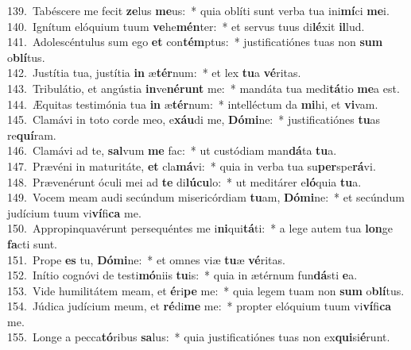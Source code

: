{139.~}Tabéscere me fecit \textbf{ze}lus \textbf{me}us:~* quia oblíti sunt verba tua ini\textbf{mí}ci \textbf{me}i.\\
{140.~}Ignítum elóquium tuum \textbf{ve}he\textbf{mén}ter:~* et servus tuus di\textbf{lé}xit \textbf{il}lud.\\
{141.~}Adolescéntulus sum ego \textbf{et} con\textbf{tém}ptus:~* justificatiónes tuas non \textbf{sum} o\textbf{blí}tus.\\
{142.~}Justítia tua, justítia \textbf{in} æ\textbf{tér}num:~* et lex \textbf{tu}a \textbf{vé}ritas.\\
{143.~}Tribulátio, et angústia \textbf{in}ve\textbf{né}\textbf{runt} me:~* mandáta tua medi\textbf{tá}tio \textbf{me}a est.\\
{144.~}Æquitas testimónia tua \textbf{in} æ\textbf{tér}num:~* intelléctum da \textbf{mi}hi, et \textbf{vi}vam.\\
{145.~}Clamávi in toto corde meo, e\textbf{xáu}di me, \textbf{Dó}\textbf{mi}ne:~* justificatiónes \textbf{tu}as re\textbf{quí}ram.\\
{146.~}Clamávi ad te, \textbf{sal}vum \textbf{me} fac:~* ut custódiam man\textbf{dá}ta \textbf{tu}a.\\
{147.~}Prævéni in maturitáte, \textbf{et} cla\textbf{má}vi:~* quia in verba tua su\textbf{per}spe\textbf{rá}vi.\\
{148.~}Prævenérunt óculi mei ad \textbf{te} di\textbf{lú}\textbf{cu}lo:~* ut meditárer e\textbf{ló}quia \textbf{tu}a.\\
{149.~}Vocem meam audi secúndum misericórdiam \textbf{tu}am, \textbf{Dó}\textbf{mi}ne:~* et secúndum judícium tuum vi\textbf{ví}fi\textbf{ca} me.\\
{150.~}Appropinquavérunt persequéntes me i\textbf{ni}qui\textbf{tá}ti:~* a lege autem tua \textbf{lon}ge \textbf{fa}cti sunt.\\
{151.~}Prope \textbf{es} tu, \textbf{Dó}\textbf{mi}ne:~* et omnes viæ \textbf{tu}æ \textbf{vé}ritas.\\
{152.~}Inítio cognóvi de testi\textbf{mó}niis \textbf{tu}is:~* quia in ætérnum fun\textbf{dá}sti \textbf{e}a.\\
{153.~}Vide humilitátem meam, et \textbf{é}ri\textbf{pe} me:~* quia legem tuam non \textbf{sum} o\textbf{blí}tus.\\
{154.~}Júdica judícium meum, et \textbf{ré}di\textbf{me} me:~* propter elóquium tuum vi\textbf{ví}fi\textbf{ca} me.\\
{155.~}Longe a pecca\textbf{tó}ribus \textbf{sa}lus:~* quia justificatiónes tuas non ex\textbf{qui}si\textbf{é}runt.\\
